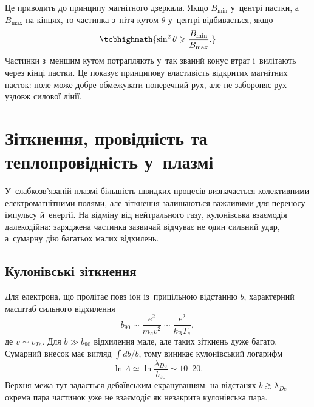 Це приводить до принципу магнітного дзеркала. Якщо $B_{\min}$ у~центрі пастки,
а~$B_{\max}$ на кінцях, то частинка з~пітч-кутом $\theta$ у~центрі відбивається, якщо
\begin{equation}\label{eq:mirror-condition}
	\tcbhighmath{\sin^2\theta\geqslant\frac{B_{\min}}{B_{\max}}.}
\end{equation}
Частинки з~меншим кутом потрапляють у~так званий конус втрат і~вилітають через кінці
пастки. Це показує принципову властивість відкритих магнітних пасток: поле може добре
обмежувати поперечний рух, але не забороняє рух уздовж силової лінії.


\section{Зіткнення, провідність та теплопровідність у~плазмі}\label{sec:plasma-collisions}\hypertarget{plasma-collisions}{}

У~слабкозв'язаній плазмі більшість швидких процесів визначається колективними
електромагнітними полями, але зіткнення залишаються важливими для переносу імпульсу
й~енергії. На відміну від нейтрального газу, кулонівська взаємодія далекодійна: заряджена
частинка зазвичай відчуває не один сильний удар, а~сумарну дію багатьох малих відхилень.



\subsection*{Кулонівські зіткнення}



Для електрона, що пролітає повз іон із~прицільною відстанню $b$, характерний масштаб
сильного відхилення
\begin{equation*}
	b_{90}\sim\frac{e^2}{m_ev^2}\sim\frac{e^2}{k_{\mathrm B}T_e},
\end{equation*}
де $v\sim v_{Te}$. Для $b\gg b_{90}$ відхилення мале, але таких зіткнень дуже багато.
Сумарний внесок має вигляд $\int db/b$, тому виникає кулонівський логарифм
\begin{equation}\label{eq:coulomb-log}
	\ln\Lambda\simeq\ln\frac{\lambda_{De}}{b_{90}}\sim10\text{--}20.
\end{equation}
Верхня межа тут задається дебаївським екрануванням: на відстанях $b\gtrsim\lambda_{De}$
окрема пара частинок уже не взаємодіє як незакрита кулонівська пара.

